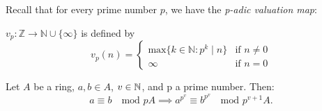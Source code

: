 Recall that for every prime number $p$, we have the \textit{p-adic valuation map}:
\begin{definition}
   $v_p \colon \mathbb{Z} \to \mathbb{N} \cup\{\infty\}$
    is defined by 
    \[
        v_p(n)=
        \begin{cases}
        \mathrm{max}\{k \in \mathbb{N} : p^k \mid n\} & \text{if } n \neq 0\\
        \infty & \text{if } n=0
        \end{cases} 
    \]

\end{definition}

\begin{lemma}\label{lem: congruences}
    Let $A$ be a ring, $a,b \in A$, $v \in \mathbb{N}$, and p a prime number. Then:
    \[
        a \equiv b \quad \text{mod } pA \implies a^{p^{v}} \equiv b^{p^{v}} \quad \text{mod } p^{v+1}A.
    \]
\end{lemma}

